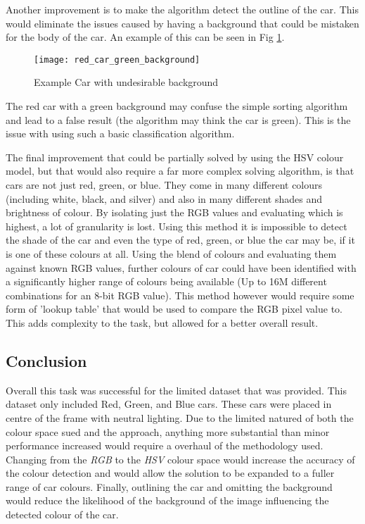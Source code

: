 \documentclass[conference]{IEEEtran}
\begin{document}
Another improvement is to make the algorithm detect the outline of the car. This would eliminate the issues caused by having a background that could be mistaken for the body of the car. An example of this can be seen in Fig \ref{fig:red_car_green_background}.

\begin{figure}[H]
\centerline{\texttt{[image: red\_car\_green\_background]}}
\caption{Example Car with undesirable background}
\label{fig:red_car_green_background}
\end{figure}

The red car with a green background may confuse the simple sorting algorithm and lead to a false result (the algorithm may think the car is green). This is the issue with using such a basic classification algorithm.

The final improvement that could be partially solved by using the HSV colour model, but that would also require a far more complex solving algorithm, is that cars are not just red, green, or blue. They come in many different colours (including white, black, and silver) and also in many different shades and brightness of colour. By isolating just the RGB values and evaluating which is highest, a lot of granularity is lost. Using this method it is impossible to detect the shade of the car and even the type of red, green, or blue the car may be, if it is one of these colours at all. Using the blend of colours and evaluating them against known RGB values, further colours of car could have been identified with a significantly higher range of colours being available (Up to 16M different combinations for an 8-bit RGB value). This method however would require some form of 'lookup table' that would be used to compare the RGB pixel value to. This adds complexity to the task, but allowed for a better overall result.

\subsection{Conclusion}

Overall this task was successful for the limited dataset that was provided. This dataset only included Red, Green, and Blue cars. These cars were placed in centre of the frame with neutral lighting. Due to the limited natured of both the colour space sued and the approach, anything more substantial than minor performance increased would require a overhaul of the methodology used. Changing from the \textit{RGB} to the \textit{HSV} colour space would increase the accuracy of the colour detection and would allow the solution to be expanded to a fuller range of car colours. Finally, outlining the car and omitting the background would reduce the likelihood of the background of the image influencing the detected colour of the car.
\end{document}
